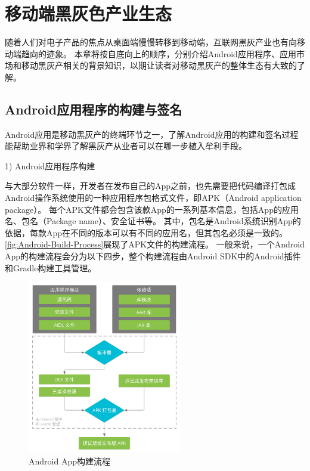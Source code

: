 \chapter{移动端黑灰色产业生态}
\label{chp:background}

随着人们对电子产品的焦点从桌面端慢慢转移到移动端，互联网黑灰产业也有向移动端趋向的迹象。
本章将按自底向上的顺序，分别介绍Android应用程序、应用市场和移动黑灰产相关的背景知识，以期让读者对移动黑灰产的整体生态有大致的了解。

\section{Android应用程序的构建与签名}
\label{sec:signature}

Android应用是移动黑灰产的终端环节之一，了解Android应用的构建和签名过程能帮助业界和学界了解黑灰产从业者可以在哪一步植入牟利手段。

1) Android应用程序构建

与大部分软件一样，开发者在发布自己的App之前，也先需要把代码编译打包成Android操作系统使用的一种应用程序包格式文件，即APK（Android application package）。
每个APK文件都会包含该款App的一系列基本信息，包括App的应用名、包名（Package name）、安全证书等。
其中，包名是Android系统识别App的依据，每款App在不同的版本可以有不同的应用名，但其包名必须是一致的。
\autoref{fig:Android-Build-Process}展现了APK文件的构建流程。
一般来说，一个Android App的构建流程会分为以下四步，整个构建流程由Android SDK中的Android插件和Gradle构建工具管理。

\begin{figure}[htbp]
	\centering
	\includegraphics[width=0.6\textwidth]{./Figures/edwin-build-process-CHN.png}
	\caption{Android App构建流程}
	\label{fig:Android-Build-Process}
\end{figure}

